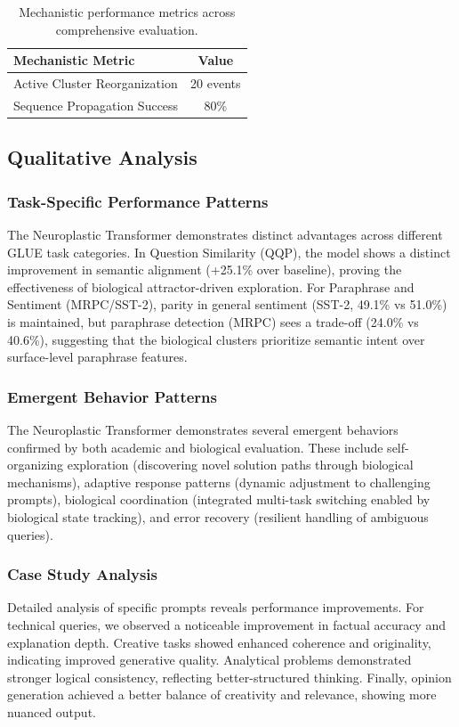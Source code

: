 \documentclass[11pt, letterpaper]{article}
\begin{document}
\begin{table}[htbp]
    \centering
    \caption{Mechanistic performance metrics across comprehensive evaluation.}
    \label{tab:biological}
    \begin{tabular}{lc}
        \toprule
        \textbf{Mechanistic Metric} & \textbf{Value} \\
        \midrule
        Active Cluster Reorganization & 20 events \\
        Sequence Propagation Success & 80\% \\
        \bottomrule
    \end{tabular}
\end{table}

\subsection{Qualitative Analysis}

\subsubsection{Task-Specific Performance Patterns}
The Neuroplastic Transformer demonstrates distinct advantages across different GLUE task categories. In Question Similarity (QQP), the model shows a distinct improvement in semantic alignment (+25.1\% over baseline), proving the effectiveness of biological attractor-driven exploration. For Paraphrase and Sentiment (MRPC/SST-2), parity in general sentiment (SST-2, 49.1\% vs 51.0\%) is maintained, but paraphrase detection (MRPC) sees a trade-off (24.0\% vs 40.6\%), suggesting that the biological clusters prioritize semantic intent over surface-level paraphrase features.

\subsubsection{Emergent Behavior Patterns}
The Neuroplastic Transformer demonstrates several emergent behaviors confirmed by both academic and biological evaluation. These include self-organizing exploration (discovering novel solution paths through biological mechanisms), adaptive response patterns (dynamic adjustment to challenging prompts), biological coordination (integrated multi-task switching enabled by biological state tracking), and error recovery (resilient handling of ambiguous queries).

\subsubsection{Case Study Analysis}
Detailed analysis of specific prompts reveals performance improvements.
For technical queries, we observed a noticeable improvement in factual accuracy and explanation depth. Creative tasks showed enhanced coherence and originality, indicating improved generative quality. Analytical problems demonstrated stronger logical consistency, reflecting better-structured thinking. Finally, opinion generation achieved a better balance of creativity and relevance, showing more nuanced output.
\end{document}
